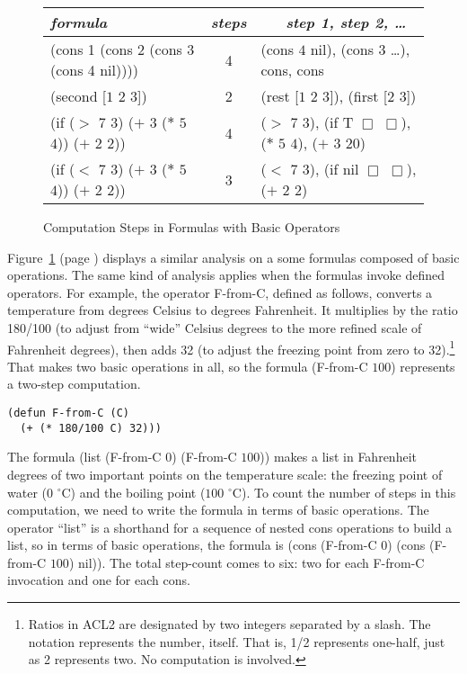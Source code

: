 \begin{figure}
\begin{center}
\begin{tabular}{lcl}
\hline
       \hspace*{5mm}\emph{formula}                            &\emph{steps}&~~~\emph{step 1, step 2, \dots}\\ \hline
    (cons 1 (cons 2 (cons 3 (cons 4 nil))))                   &     4      &(cons $4$ nil), (cons $3$ \dots), cons, cons\\
    (second [$1$ $2$ $3$])                                    &     2      &(rest [$1$ $2$ $3$]), (first [$2$ $3$])\\
    (if ($>$ $7$ $3$) ($+$ $3$ ($*$ $5$ $4$)) ($+$ $2$ $2$))  &     4      &($>$ $7$ $3$), (if T $\Box$ $\Box$), ($*$ $5$ $4$), ($+$ $3$ $20$)\\
    (if ($<$ $7$ $3$) ($+$ $3$ ($*$ $5$ $4$)) ($+$ $2$ $2$))  &     3      &($<$ $7$ $3$), (if nil $\Box$ $\Box$), ($+$ $2$ $2$)\\
\end{tabular}
\end{center}
\caption{Computation Steps in Formulas with Basic Operators}
\label{fig:basic-op-formulas}
\end{figure}

Figure~\ref{fig:basic-op-formulas} (page \pageref{fig:basic-op-formulas})
displays a similar analysis on a some formulas
composed of basic operations. The same kind of
analysis applies when the formulas invoke defined operators.
For example, the operator F-from-C, defined
as follows, converts a temperature from degrees Celsius to
degrees Fahrenheit. It multiplies by the ratio 180/100
(to adjust from ``wide'' Celsius degrees to the
more refined scale of Fahrenheit degrees), then adds 32
(to adjust the freezing point from zero to 32).\footnote{Ratios
in ACL2 are designated
by two integers separated by a slash.
The notation represents the number, itself.
That is, 1/2 represents one-half, just as 2 represents two.
No computation is involved.}
That makes two basic operations in all, so the formula
(F-from-C $100$) represents a two-step computation.

\begin{Verbatim}
(defun F-from-C (C)
  (+ (* 180/100 C) 32)))
\end{Verbatim}

The formula (list (F-from-C $0$) (F-from-C $100$))
makes a list in Fahrenheit degrees of two important
points on the temperature scale:
the freezing point of water ($0$ $^\circ$C) and the boiling point ($100$ $^\circ$C).
To count the number of steps in this computation,
we need to write the formula in terms of basic operations.
The operator ``list'' is a shorthand for a sequence of nested
cons operations to build a list,
so in terms of basic operations, the formula is
(cons (F-from-C $0$) (cons (F-from-C $100$) nil)).
The total step-count comes to six: two for each F-from-C invocation
and one for each cons.

